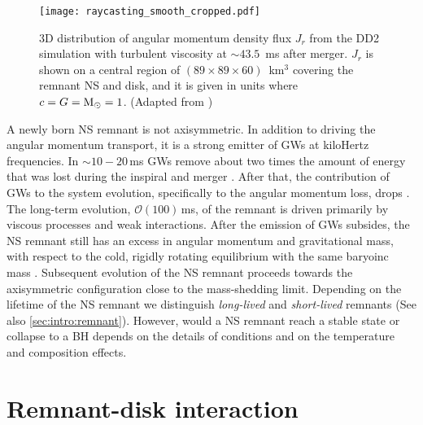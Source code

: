 \begin{figure}[t]
    \centering
    \texttt{[image: raycasting\_smooth\_cropped.pdf]}
    \caption{3D distribution of angular momentum density flux $J_r$
        from the DD2 simulation with turbulent viscosity at ${\sim}43.5$~ms after
        merger. $J_r$ is shown on a central region of
        $(89\times89\times60)$~km${}^3$ covering the remnant NS
        and disk, and it is given in units where $c=G={\text{M}_{\odot}}=1$.
        (Adapted from \citet{Nedora:2019jhl})
    }
    \label{fig:ang_mom_flux}
\end{figure}


A newly born \ac{NS} \pmerg{} remnant is not axisymmetric. In addition to driving the angular 
momentum transport, it is a strong emitter of \acp{GW} at kiloHertz frequencies.
In ${\sim}10-20\,$ms \pmerg{} \acp{GW} remove about two times the 
amount of energy that was lost during the inspiral and merger \citep{Bernuzzi:2015opx}.
%
After that, the contribution of \acp{GW} to the system evolution, specifically to the 
angular momentum loss, drops \citep{Radice:2018xqa}. The long-term evolution, $\mathcal{O}(100)\,$ms,
of the remnant is driven primarily by viscous processes and weak interactions.
%
After the emission of \acp{GW} subsides, the \ac{NS} remnant still has an excess 
in angular momentum and gravitational mass, with respect to the cold, 
rigidly rotating equilibrium with the same baryoinc mass \citep{Radice:2018xqa}.
%
Subsequent evolution of the \ac{NS} remnant proceeds towards the axisymmetric configuration 
close to the mass-shedding limit. 
Depending on the lifetime of the \ac{NS} remnant we distinguish \textit{long-lived}
and \textit{short-lived} remnants (See also \ref{sec:intro:remnant}).
However, would a \ac{NS} remnant reach a stable state or collapse to a \ac{BH} depends on the 
details of \pmerg{} conditions and on the temperature and composition effects.
%


\section{Remnant-disk interaction}\label{sec:bns_sims:remdisk}

